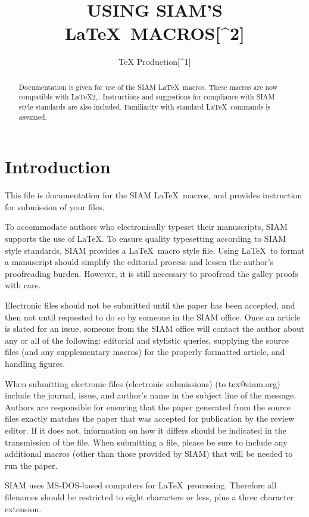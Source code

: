 \documentclass[]{article}
\title{USING SIAM'S LaTeX~MACROS{[}\^{}2{]}}
\author{TeX Production{[}\^{}1{]}}
\date{}
\begin{document}
\maketitle
\begin{abstract}
Documentation is given for use of the SIAM LaTeX~macros. These macros
are now compatible with LaTeX\(2_{\varepsilon}\). Instructions and
suggestions for compliance with SIAM style standards are also included.
Familiarity with standard LaTeX~commands is assumed.
\end{abstract}

\section{Introduction}\label{introduction}

This file is documentation for the SIAM LaTeX~macros, and provides
instruction for submission of your files.

To accommodate authors who electronically typeset their manuscripts,
SIAM supports the use of LaTeX. To ensure quality typesetting according
to SIAM style standards, SIAM provides a LaTeX~macro style file. Using
LaTeX~to format a manuscript should simplify the editorial process and
lessen the author's proofreading burden. However, it is still necessary
to proofread the galley proofs with care.

Electronic files should not be submitted until the paper has been
accepted, and then not until requested to do so by someone in the SIAM
office. Once an article is slated for an issue, someone from the SIAM
office will contact the author about any or all of the following:
editorial and stylistic queries, supplying the source files (and any
supplementary macros) for the properly formatted article, and handling
figures.

When submitting electronic files (electronic submissions) (to
{tex@siam.org}) include the journal, issue, and author's name in the
subject line of the message. Authors are responsible for ensuring that
the paper generated from the source files exactly matches the paper that
was accepted for publication by the review editor. If it does not,
information on how it differs should be indicated in the transmission of
the file. When submitting a file, please be sure to include any
additional macros (other than those provided by SIAM) that will be
needed to run the paper.

SIAM uses MS-DOS-based computers for LaTeX~processing. Therefore all
filenames should be restricted to eight characters or less, plus a three
character extension.
\end{document}
